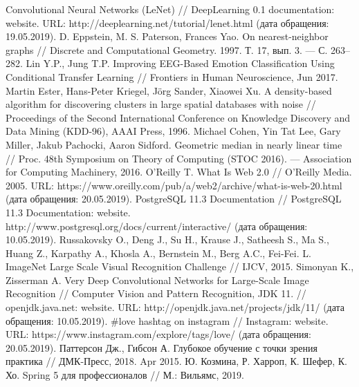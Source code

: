 \begingroup 
\renewcommand{\section}[2]{\anonsection{Библиографический список}}
\onehalfspacing
\begin{thebibliography}{00}

    Convolutional Neural Networks (LeNet) // 
    DeepLearning 0.1 documentation: website. 
    URL: http://deeplearning.net/tutorial/lenet.html 
    (дата обращения: 19.05.2019).
    D. Eppstein, M. S. Paterson, Frances Yao. 
    On nearest-neighbor graphs // 
    Discrete and Computational Geometry. 
    1997. Т. 17, вып. 3. — С. 263–282.
    Lin Y.P., Jung T.P.
    Improving EEG-Based Emotion Classification Using Conditional Transfer Learning //
    Frontiers in Human Neuroscience, 
    Jun 2017.
    Martin Ester, Hans-Peter Kriegel, Jörg Sander, Xiaowei Xu.
    A density-based algorithm for discovering clusters in large spatial databases with noise // 
    Proceedings of the Second International Conference on Knowledge Discovery and Data Mining (KDD-96),
    AAAI Press, 
    1996.
    Michael Cohen, Yin Tat Lee, Gary Miller, Jakub Pachocki, Aaron Sidford. 
    Geometric median in nearly linear time // 
    Proc. 48th Symposium on Theory of Computing (STOC 2016). — Association for Computing Machinery, 
    2016.
    O'Reilly T. What Is Web 2.0 // 
    O’Reilly Media. 
    2005. 
    URL: https://www.oreilly.com/pub/a/web2/archive/what-is-web-20.html 
    (дата обращения: 20.05.2019).
    PostgreSQL 11.3 Documentation // 
    PostgreSQL 11.3 Documentation: website. 
    http://www.postgresql.org/docs/current/interactive/
    (дата обращения: 10.05.2019).
    Russakovsky O., Deng J., Su H., Krause J., Satheesh S., Ma S., Huang Z., Karpathy A., Khosla A., Bernstein M., Berg A.C., Fei-Fei. L. 
    ImageNet Large Scale Visual Recognition Challenge // 
    IJCV, 
    2015.
    Simonyan K., Zisserman A. 
    Very Deep Convolutional Networks for Large-Scale Image Recognition // 
    Computer Vision and Pattern Recognition, 
    JDK 11. // 
    openjdk.java.net: website. 
    URL: http://openjdk.java.net/projects/jdk/11/
    (дата обращения: 10.05.2019).
    \#love hashtag on instagram // 
    Instagram: website. 
    URL: https://www.instagram.com/explore/tags/love/ 
    (дата обращения: 20.05.2019).
    Паттерсон Дж., Гибсон А. 
    Глубокое обучение с точки зрения практика //
    ДМК-Пресс, 
    2018.
    Apr 2015.
    Ю. Козмина, Р. Харроп, К. Шефер, К. Хо. 
    Spring 5 для профессионалов //
    М.: Вильямс, 
    2019.

\end{thebibliography}
\endgroup

\clearpage